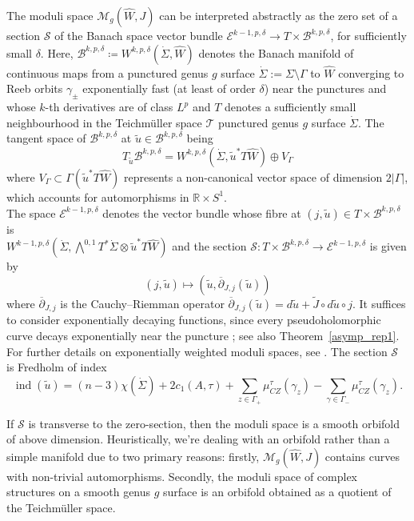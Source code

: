 \documentclass[11pt, a4paper]{amsart}
\newcommand{\cB}{\mathcal{B}}
\newcommand{\cE}{\mathcal{E}}
\newcommand{\cM}{\mathcal{M}}
\newcommand{\cS}{\mathcal{S}}
\newcommand{\cT}{\mathcal{T}}
\DeclareMathOperator{\ind}{ind}
\begin{document}
The moduli space $\cM_g(\widehat{W},J)$ can be interpreted abstractly as the zero set of a section $\cS$ of the Banach space vector bundle $\cE^{k-1,p,\delta} \rightarrow T \times \cB^{k,p,\delta}$, for sufficiently small $\delta$. Here, $\cB^{k,p,\delta}\coloneqq W^{k,p,\delta}(\dot{\Sigma},\widehat{W})$ denotes the Banach manifold of continuous maps from a punctured genus $g$ surface $\dot{\Sigma}:=\Sigma\setminus \Gamma$ to $\widehat{W}$ converging to Reeb orbits $\gamma_{\pm}$ exponentially fast (at least of order $\delta$) near the punctures and whose $k$-th derivatives are of class $L^p$ and $T$ denotes a sufficiently small neighbourhood in the Teichm\"uller space $\cT$ punctured genus $g$ surface $\dot{\Sigma}$. The tangent space of $\cB^{k,p,\delta}$ at $\tilde{u} \in \cB^{k,p,\delta}$ being
$$T_{\tilde{u}}\cB^{k,p,\delta} = W^{k,p,\delta}(\dot{\Sigma},\tilde{u}^*T\widehat{W}) \oplus V_{\Gamma}$$
where $V_{\Gamma}\subset \Gamma(\tilde{u}^*T\widehat{W})$ represents a non-canonical vector space of dimension $2|\Gamma|$, which accounts for automorphisms in $\mathbb{R} \times S^1$.\\

The space $\cE^{k-1,p,\delta}$ denotes the vector bundle whose fibre at $(j,\tilde{u})\in T \times \cB^{k,p,\delta}$ is \\
$W^{k-1,p,\delta}(\dot{\Sigma}, \bigwedge^{0,1} T^*\dot{\Sigma}\otimes \tilde{u}^*T\widehat{W})$ and the section
$ \cS\colon T \times \cB^{k,p,\delta} \rightarrow \cE^{k-1,p,\delta}$ is given by 
$$(j, \tilde{u}) \mapsto (\tilde{u}, \overline{\partial}_{J,j}(\tilde{u}))$$
where $\overline{\partial}_{J,j}$ is the Cauchy--Riemman operator $\overline{\partial}_{J,j}(\tilde{u})=d\tilde{u} + \tilde{J} \circ d \tilde{u} \circ j$. It suffices to consider exponentially decaying functions, since every pseudoholomorphic curve decays exponentially near the puncture \cite{HWZ1,HWZ2,HWZ3}; see also Theorem~\ref{asymp_rep1}. For further details on exponentially weighted moduli spaces, see \cite[Section~7.2]{SFTwendl}. The section $\cS$ is Fredholm of index 
$$\ind(\tilde{u})=(n-3)\chi(\dot{\Sigma})+2c_1(A,\tau)+\sum_{z\in \Gamma_{+}}\mu_{CZ}^{\tau}(\gamma_z)-\sum_{\gamma \in \Gamma_{-}}\mu_{CZ}^{\tau}(\gamma_z).$$

If $\cS$ is transverse to the zero-section, then the moduli space is a smooth orbifold of above dimension. Heuristically, we're dealing with an orbifold rather than a simple manifold due to two primary reasons: firstly, $\cM_g(\widehat{W},J)$ contains curves with non-trivial automorphisms. Secondly, the moduli space of complex structures on a smooth genus $g$ surface is an orbifold obtained as a quotient of the Teichm\"uller space.\\
\end{document}
